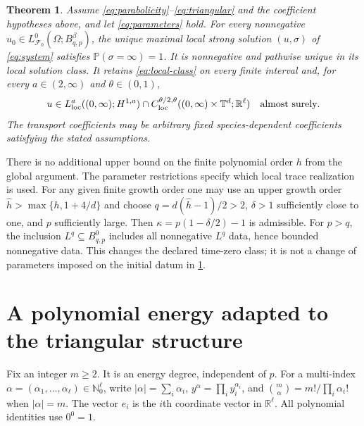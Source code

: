 \documentclass[11pt]{amsart}
\newtheorem{theorem}{Theorem}[section]
\theoremstyle{definition}
\newcommand{\T}{\mathbb T}
\newcommand{\R}{\mathbb R}
\newcommand{\N}{\mathbb N}
\newcommand{\PP}{\mathbb P}
\newcommand{\F}{\mathcal F}
\numberwithin{equation}{section}
\begin{document}
\pagebreak[3]
\begin{theorem}\label{thm:main}
Assume \eqref{eq:parabolicity}--\eqref{eq:triangular} and the coefficient
hypotheses above, and let \eqref{eq:parameters} hold. For every
nonnegative $u_0\in L^0_{\F_0}(\Omega;B^\beta_{q,p})$, the unique maximal
local strong solution $(u,\sigma)$ of \eqref{eq:system} satisfies
$\PP(\sigma=\infty)=1$. It is nonnegative and pathwise unique in its
local solution class. It retains \eqref{eq:local-class} on every finite
interval and, for every $a\in(2,\infty)$ and $\theta\in(0,1)$,
\begin{equation}\label{eq:regularization}
u\in L^a_{\rm loc}((0,\infty);H^{1,a})
 \cap C^{\theta/2,\theta}_{\rm loc}((0,\infty)\times\T^d;\R^\ell)
 \quad\hbox{almost surely}.
\end{equation}
The transport coefficients may be arbitrary fixed species-dependent
coefficients satisfying the stated assumptions.
\end{theorem}

There is no additional upper bound on the finite polynomial order $h$
from the global argument. The parameter restrictions specify which
local trace realization is used. For any given finite growth order one
may use an upper growth order $\widehat h>\max\{h,1+4/d\}$ and choose
$q=d(\widehat h-1)/2>2$, $\delta>1$ sufficiently close to one, and
$p$ sufficiently large. Then $\kappa=p(1-\delta/2)-1$ is admissible.
For $p>q$, the inclusion $L^q\subseteq B^0_{q,p}$ includes all
nonnegative $L^q$ data, hence bounded nonnegative data. This changes the
declared time-zero class; it is not a change of parameters imposed on
the initial datum in \cref{thm:main}.

\section{A polynomial energy adapted to the triangular structure}

Fix an integer $m\geq2$. It is an energy degree, independent of $p$.
For a multi-index $\alpha=(\alpha_1,\ldots,\alpha_\ell)\in\N_0^\ell$,
write $|\alpha|=\sum_i\alpha_i$,
$y^\alpha=\prod_i y_i^{\alpha_i}$, and
$\binom m\alpha=m!/\prod_i\alpha_i!$ when $|\alpha|=m$.
The vector $e_i$ is the $i$th coordinate vector in $\R^\ell$.
All polynomial identities use $0^0=1$.
\end{document}
